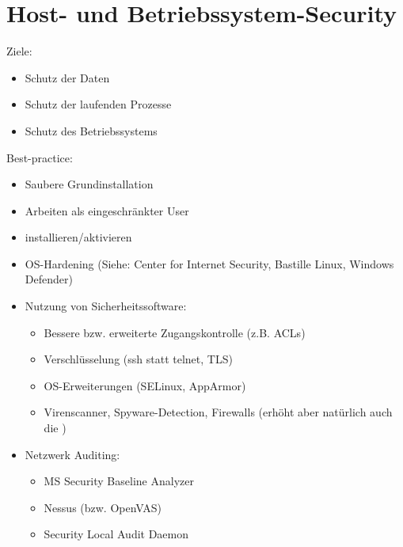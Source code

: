 \chapter{Host- und Betriebssystem-Security}
Ziele:
\begin{itemize}
    \item Schutz der Daten
    \item Schutz der laufenden Prozesse
    \item Schutz des Betriebssystems
\end{itemize}

Best-practice:
\begin{itemize}
    \item Saubere Grundinstallation
    \item Arbeiten als eingeschränkter User
    \item {} installieren/aktivieren
    \item OS-Hardening (Siehe: Center for Internet Security, Bastille Linux, Windows Defender)
    \item Nutzung von Sicherheitssoftware:
        \begin{itemize}
            \item Bessere bzw. erweiterte Zugangskontrolle (z.B. ACLs)
            \item Verschlüsselung (ssh statt telnet, TLS)
            \item OS-Erweiterungen (SELinux, AppArmor)
            \item Virenscanner, Spyware-Detection, Firewalls
                (erhöht aber natürlich auch die )
        \end{itemize}
    \item Netzwerk Auditing:
        \begin{itemize}
            \item MS Security Baseline Analyzer
            \item Nessus (bzw. OpenVAS)
            \item Security Local Audit Daemon
        \end{itemize}
\end{itemize}

